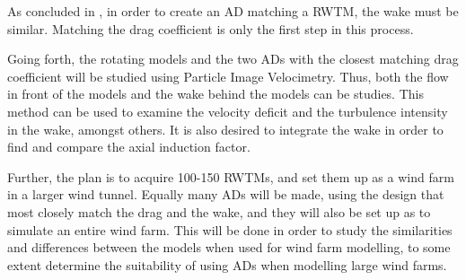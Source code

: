 As concluded in \cite{}, in order to create an \gls{AD} matching a \gls{RWTM}, the wake must be similar. Matching the drag coefficient is only the first step in this process. 

Going forth, the rotating models and the two \gls{AD}s with the closest matching drag coefficient will be studied using Particle Image Velocimetry. Thus, both the flow in front of the models and the wake behind the models can be studies. This method can be used to examine the velocity deficit and the turbulence intensity in the wake, amongst others. It is also desired to integrate the wake in order to find and compare the axial induction factor. 

Further, the plan is to acquire 100-150 \gls{RWTM}s, and set them up as a wind farm in a larger wind tunnel. Equally many \gls{AD}s will be made, using the design that most closely match the drag and the wake, and they will also be set up as to simulate an entire wind farm. This will be done in order to study the similarities and differences between the models when used for wind farm modelling, to some extent determine the suitability of using \gls{AD}s when modelling large wind farms. 




